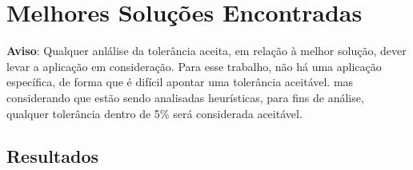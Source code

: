 \section{Melhores Soluções Encontradas}
\label{section:best-solutions}

\textbf{Aviso}: Qualquer anlálise da tolerância aceita, em relação à melhor solução, dever levar a aplicação em consideração. Para esse trabalho, não há uma aplicação específica, de forma que é difícil apontar uma tolerância aceitável. mas considerando que estão sendo analisadas heurísticas, para fins de análise, qualquer tolerância dentro de 5\% será considerada aceitável.

\subsection{Resultados}
\label{subsection:best-solutions-results}
